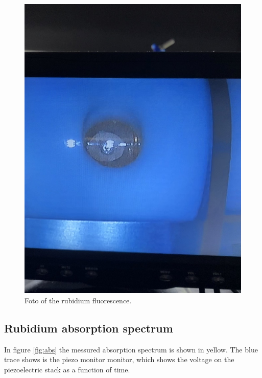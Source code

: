 \begin{figure}
    \centering
    \includegraphics[width=\textwidth]{fl.jpeg}
    \caption{Foto of the rubidium fluorescence.}
    \label{fig:ffl}
\end{figure}

\subsection{Rubidium absorption spectrum}
In figure \ref{fig:abs} the messured absorption spectrum is shown in yellow. The blue trace shows is the piezo monitor
monitor, which shows the voltage on the piezoelectric stack as a function of time.

